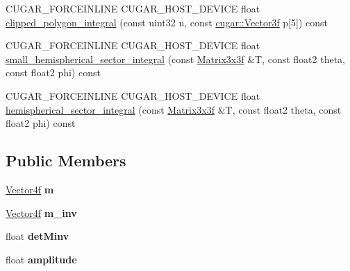 \begin{DoxyCompactItemize}
\item 
C\+U\+G\+A\+R\+\_\+\+F\+O\+R\+C\+E\+I\+N\+L\+I\+NE C\+U\+G\+A\+R\+\_\+\+H\+O\+S\+T\+\_\+\+D\+E\+V\+I\+CE float \hyperlink{structcugar_1_1_l_t_c_bsdf_1_1_l_t_c_a394cb2a772f4567ab0d4ca9b9b13d0bc}{clipped\+\_\+polygon\+\_\+integral} (const uint32 n, const \hyperlink{structcugar_1_1_vector}{cugar\+::\+Vector3f} p\mbox{[}5\mbox{]}) const
\item 
C\+U\+G\+A\+R\+\_\+\+F\+O\+R\+C\+E\+I\+N\+L\+I\+NE C\+U\+G\+A\+R\+\_\+\+H\+O\+S\+T\+\_\+\+D\+E\+V\+I\+CE float \hyperlink{structcugar_1_1_l_t_c_bsdf_1_1_l_t_c_a7d4903a9fdc6a04cc1f54796b9cfaa65}{small\+\_\+hemispherical\+\_\+sector\+\_\+integral} (const \hyperlink{structcugar_1_1_matrix}{Matrix3x3f} \&T, const float2 theta, const float2 phi) const
\item 
C\+U\+G\+A\+R\+\_\+\+F\+O\+R\+C\+E\+I\+N\+L\+I\+NE C\+U\+G\+A\+R\+\_\+\+H\+O\+S\+T\+\_\+\+D\+E\+V\+I\+CE float \hyperlink{structcugar_1_1_l_t_c_bsdf_1_1_l_t_c_a3df8a52a50e9305544b9fc304dfb0221}{hemispherical\+\_\+sector\+\_\+integral} (const \hyperlink{structcugar_1_1_matrix}{Matrix3x3f} \&T, const float2 theta, const float2 phi) const
\end{DoxyCompactItemize}
\subsection*{Public Members}
\begin{DoxyCompactItemize}
\item 
\mbox{\label{structcugar_1_1_l_t_c_bsdf_1_1_l_t_c_aedc8e1efec9745b0eb4c7dbdabc4d1c7}} 
\hyperlink{structcugar_1_1_vector}{Vector4f} {\bfseries m}
\item 
\mbox{\label{structcugar_1_1_l_t_c_bsdf_1_1_l_t_c_a087a01e7cf61acdae685d5142ed6c475}} 
\hyperlink{structcugar_1_1_vector}{Vector4f} {\bfseries m\+\_\+inv}
\item 
\mbox{\label{structcugar_1_1_l_t_c_bsdf_1_1_l_t_c_acd1767bd0eb7a2bfdde5d0ba7eb7a496}} 
float {\bfseries det\+Minv}
\item 
\mbox{\label{structcugar_1_1_l_t_c_bsdf_1_1_l_t_c_a996cdb52381e1b3ed1fe10ab66021c89}} 
float {\bfseries amplitude}
\end{DoxyCompactItemize}



